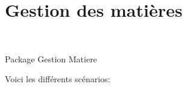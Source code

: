 \section{Gestion des mati{\`e}res}

\begin{center}
\\
\par{Package Gestion Matiere}
\end{center}
Voici les diff{\'e}rents sc{\'e}narios:\\

